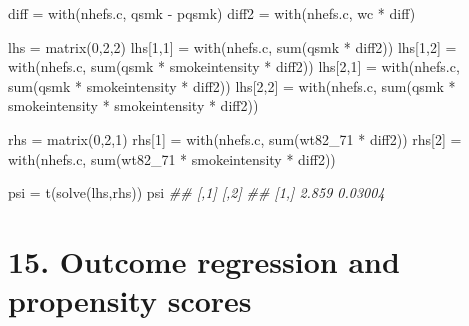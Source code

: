 \documentclass[
  10pt,
  a4paper,
]{book}
\newenvironment{Shaded}{\begin{snugshade}}{\end{snugshade}}
\newcommand{\DecValTok}[1]{\textcolor[rgb]{0.68,0.00,0.00}{#1}}
\newcommand{\DocumentationTok}[1]{\textcolor[rgb]{0.37,0.37,0.37}{\textit{#1}}}
\newcommand{\FunctionTok}[1]{\textcolor[rgb]{0.28,0.35,0.67}{#1}}
\newcommand{\NormalTok}[1]{\textcolor[rgb]{0.00,0.46,0.62}{#1}}
\newcommand{\OtherTok}[1]{\textcolor[rgb]{0.00,0.46,0.62}{#1}}
\newcommand{\SpecialCharTok}[1]{\textcolor[rgb]{0.37,0.37,0.37}{#1}}
\begin{document}
\begin{Shaded}
\begin{Highlighting}[]
\NormalTok{diff }\OtherTok{=} \FunctionTok{with}\NormalTok{(nhefs.c, qsmk }\SpecialCharTok{{-}}\NormalTok{ pqsmk)}
\NormalTok{diff2 }\OtherTok{=} \FunctionTok{with}\NormalTok{(nhefs.c, wc }\SpecialCharTok{*}\NormalTok{ diff)}

\NormalTok{lhs }\OtherTok{=} \FunctionTok{matrix}\NormalTok{(}\DecValTok{0}\NormalTok{,}\DecValTok{2}\NormalTok{,}\DecValTok{2}\NormalTok{)}
\NormalTok{lhs[}\DecValTok{1}\NormalTok{,}\DecValTok{1}\NormalTok{] }\OtherTok{=} \FunctionTok{with}\NormalTok{(nhefs.c, }\FunctionTok{sum}\NormalTok{(qsmk }\SpecialCharTok{*}\NormalTok{ diff2))}
\NormalTok{lhs[}\DecValTok{1}\NormalTok{,}\DecValTok{2}\NormalTok{] }\OtherTok{=} \FunctionTok{with}\NormalTok{(nhefs.c, }\FunctionTok{sum}\NormalTok{(qsmk }\SpecialCharTok{*}\NormalTok{ smokeintensity  }\SpecialCharTok{*}\NormalTok{ diff2))}
\NormalTok{lhs[}\DecValTok{2}\NormalTok{,}\DecValTok{1}\NormalTok{] }\OtherTok{=} \FunctionTok{with}\NormalTok{(nhefs.c, }\FunctionTok{sum}\NormalTok{(qsmk }\SpecialCharTok{*}\NormalTok{ smokeintensity }\SpecialCharTok{*}\NormalTok{ diff2))}
\NormalTok{lhs[}\DecValTok{2}\NormalTok{,}\DecValTok{2}\NormalTok{] }\OtherTok{=} \FunctionTok{with}\NormalTok{(nhefs.c, }\FunctionTok{sum}\NormalTok{(qsmk }\SpecialCharTok{*}\NormalTok{ smokeintensity }\SpecialCharTok{*}\NormalTok{ smokeintensity }\SpecialCharTok{*}\NormalTok{ diff2))}

\NormalTok{rhs }\OtherTok{=} \FunctionTok{matrix}\NormalTok{(}\DecValTok{0}\NormalTok{,}\DecValTok{2}\NormalTok{,}\DecValTok{1}\NormalTok{)}
\NormalTok{rhs[}\DecValTok{1}\NormalTok{] }\OtherTok{=} \FunctionTok{with}\NormalTok{(nhefs.c, }\FunctionTok{sum}\NormalTok{(wt82\_71 }\SpecialCharTok{*}\NormalTok{ diff2))}
\NormalTok{rhs[}\DecValTok{2}\NormalTok{] }\OtherTok{=} \FunctionTok{with}\NormalTok{(nhefs.c, }\FunctionTok{sum}\NormalTok{(wt82\_71 }\SpecialCharTok{*}\NormalTok{ smokeintensity }\SpecialCharTok{*}\NormalTok{ diff2))}

\NormalTok{psi }\OtherTok{=} \FunctionTok{t}\NormalTok{(}\FunctionTok{solve}\NormalTok{(lhs,rhs))}
\NormalTok{psi}
\DocumentationTok{\#\#       [,1]    [,2]}
\DocumentationTok{\#\# [1,] 2.859 0.03004}
\end{Highlighting}
\end{Shaded}

\hypertarget{outcome-regression-and-propensity-scores}{%
\chapter*{15. Outcome regression and propensity scores}\label{outcome-regression-and-propensity-scores}}
\end{document}
